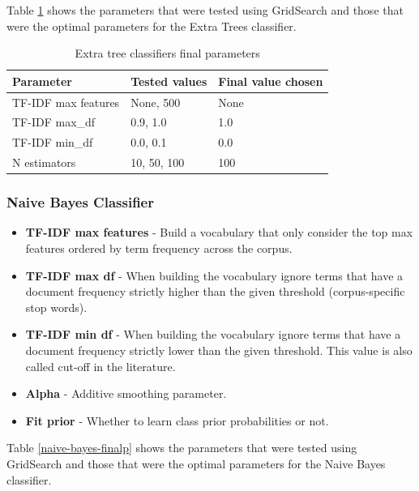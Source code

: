\documentclass[a4paper,11pt]{report}
\begin{document}
Table \ref{extra-tree-finalp} shows the parameters that were tested using GridSearch and those that were the optimal parameters for the Extra Trees classifier.

\begin{table}[h!]
\centering
\caption{Extra tree classifiers final parameters}
\label{extra-tree-finalp}
\begin{tabular}{|l|l|l|}
\hline
Parameter           & Tested values & Final value chosen \\ \hline
TF-IDF max features & None, 500     & None               \\ \hline
TF-IDF max\_df      & 0.9, 1.0      & 1.0                \\ \hline
TF-IDF min\_df      & 0.0, 0.1      & 0.0                \\ \hline
N estimators        & 10, 50, 100   & 100                \\ \hline
\end{tabular}
\end{table}

\subsubsection{Naive Bayes Classifier}
\begin{itemize}
	\item \textbf{TF-IDF max features} - Build a vocabulary that only consider the top max features ordered by term frequency across the corpus.
	\item \textbf{TF-IDF max df} - When building the vocabulary ignore terms that have a document frequency strictly higher than the given threshold (corpus-specific stop words).
	\item \textbf{TF-IDF min df} - When building the vocabulary ignore terms that have a document frequency strictly lower than the given threshold. This value is also called cut-off in the literature.
	\item \textbf{Alpha} - Additive smoothing parameter.
	\item \textbf{Fit prior} - Whether to learn class prior probabilities or not.
\end{itemize}

Table \ref{naive-bayes-finalp} shows the parameters that were tested using GridSearch and those that were the optimal parameters for the Naive Bayes classifier.
\end{document}

